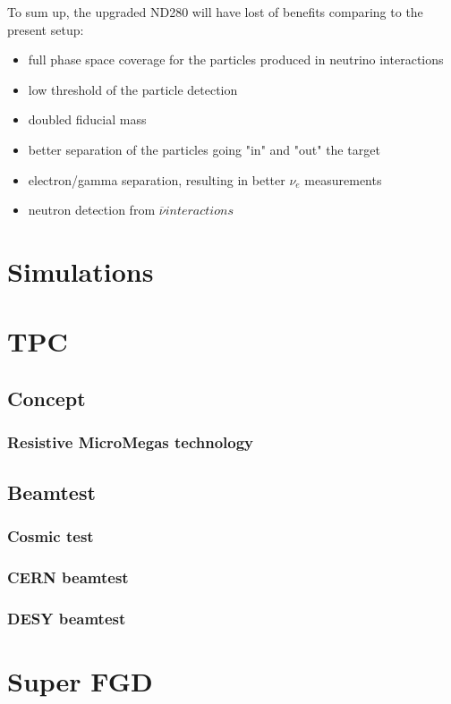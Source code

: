 \documentclass[../main.tex]{subfiles}
\begin{document}
To sum up, the upgraded ND280 will have lost of benefits comparing to the present setup:
\begin{itemize}
  \item full phase space coverage for the particles produced in neutrino interactions
  \item low threshold of the particle detection
  \item doubled fiducial mass
  \item better separation of the particles going "in" and "out" the target
  \item electron/gamma separation, resulting in better $\nu_e$ measurements
  \item neutron detection from $\overline{\nu} interactions$
\end{itemize}

\chapter{Simulations}
\label{ch:up:sim}

\chapter{TPC}
\label{ch:up:tpc}
\section{Concept}
\subsection{Resistive MicroMegas technology}
\section{Beamtest}
\subsection{Cosmic test}
\subsection{CERN beamtest}
\subsection{DESY beamtest}


\chapter{Super FGD}
\label{ch:up:sfgd}
\end{document}
